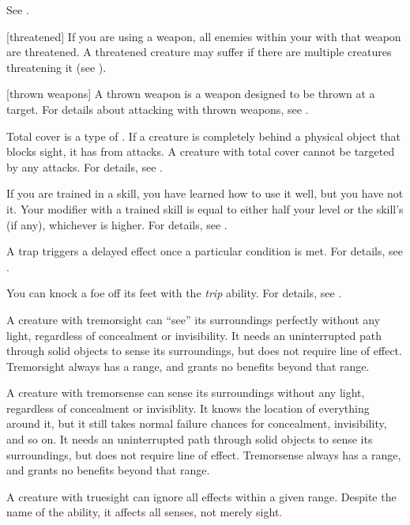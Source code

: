  See .

[threatened] If you are using a  weapon, all enemies within your  with that weapon are threatened.
A threatened creature may suffer  if there are multiple creatures threatening it (see ).

[thrown weapons] A thrown weapon is a weapon designed to be thrown at a target.
For details about attacking with thrown weapons, see .

 Total cover is a type of .
If a creature is completely behind a physical object that blocks sight, it has  from attacks.
A creature with total cover cannot be targeted by any attacks.
For details, see .

 If you are trained in a skill, you have learned how to use it well, but you have not  it.
Your modifier with a trained skill is equal to either half your level  or the skill's  (if any), whichever is higher.
For details, see .

 A trap triggers a delayed effect once a particular condition is met.
For details, see .

 You can knock a foe off its feet with the \textit{trip} ability.
For details, see .

 A creature with tremorsight can ``see'' its surroundings perfectly without any light, regardless of concealment or invisibility.
It needs an uninterrupted path through solid objects to sense its surroundings, but does not require line of effect.
Tremorsight always has a range, and grants no benefits beyond that range.

 A creature with tremorsense can sense its surroundings without any light, regardless of concealment or invisiblity.
It knows the location of everything around it, but it still takes normal failure chances for concealment, invisibility, and so on.
It needs an uninterrupted path through solid objects to sense its surroundings, but does not require line of effect.
Tremorsense always has a range, and grants no benefits beyond that range.

 A creature with truesight can ignore all  effects within a given range.
Despite the name of the ability, it affects all senses, not merely sight.

